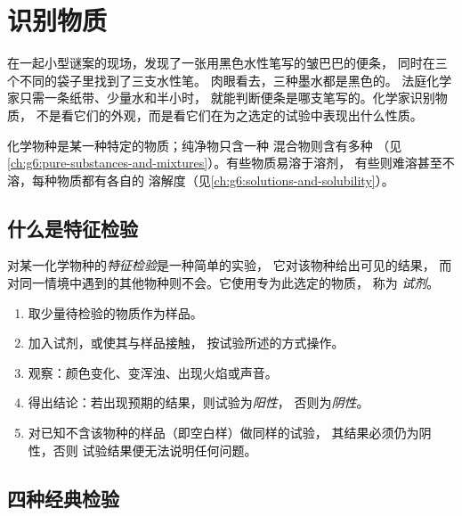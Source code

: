 \chapter{识别物质}\label{ch:g7:identifying-substances}

在一起小型谜案的现场，发现了一张用黑色水性笔写的皱巴巴的便条，
同时在三个不同的袋子里找到了三支水性笔。
肉眼看去，三种墨水都是黑色的。
法庭化学家只需一条纸带、少量水和半小时，
就能判断便条是哪支笔写的。化学家识别物质，
不是看它们的外观，而是看它们在为之选定的试验中表现出什么性质。

\begin{recall}
化学物种是某一种特定的物质；纯净物只含一种
混合物则含有多种
（见\cref{ch:g6:pure-substances-and-mixtures}）。有些物质易溶于溶剂，
有些则难溶甚至不溶，每种物质都有各自的
溶解度（见\cref{ch:g6:solutions-and-solubility}）。
\end{recall}

\section{什么是特征检验}

\begin{definition}[特征检验与试剂]\label{def:g7:identifying-substances:characteristic-test}
对某一化学物种的\emph{特征检验}是一种简单的实验，
它对该物种给出可见的结果，
而对同一情境中遇到的其他物种则不会。它使用专为此选定的物质，
称为
\emph{试剂}。
\end{definition}


\begin{method}[进行特征检验]\label{met:g7:identifying-substances:run}
\begin{enumerate}
  \item 取少量待检验的物质作为样品。
  \item 加入试剂，或使其与样品接触，
        按试验所述的方式操作。
  \item 观察：颜色变化、变浑浊、出现火焰或声音。
  \item 得出结论：若出现预期的结果，则试验为\emph{阳性}，
        否则为\emph{阴性}。
  \item 对已知不含该物种的样品（即空白样）做同样的试验，
        其结果必须仍为阴性，否则
        试验结果便无法说明任何问题。
\end{enumerate}
\end{method}

\section{四种经典检验}

